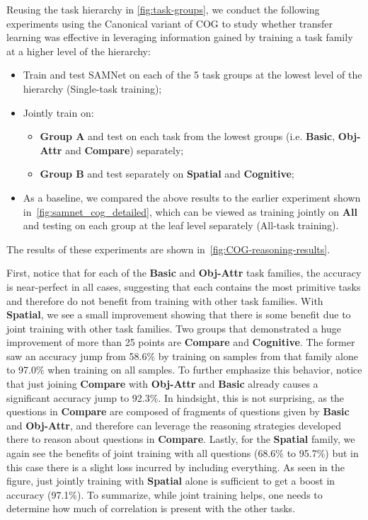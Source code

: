 Reusing the task hierarchy in \cref{fig:task-groups}, we conduct the following experiments using the Canonical variant of COG to study whether transfer learning was effective in leveraging information gained by training a task family at a higher level
of the hierarchy:
 \begin{itemize}
 	\compresslist
	\item Train and test SAMNet on each of the 5 task groups at the lowest level of the hierarchy (Single-task training);
	\item Jointly train on:
	\begin{itemize}
		\item \textbf{Group A} and test on each task from the lowest groups (i.e. \textbf{Basic}, \textbf{Obj-Attr} and \textbf{Compare}) separately;
		\item \textbf{Group B} and test separately on \textbf{Spatial} and \textbf{Cognitive};
	\end{itemize}
	\item As a baseline, we compared the above results to the earlier experiment shown in~\cref{fig:samnet_cog_detailed}, which can be viewed as training jointly on \textbf{All} and testing on each group at the leaf level separately (All-task training).
\end{itemize}

The results of these experiments are shown in~\cref{fig:COG-reasoning-results}.

First, notice that for each of the \textbf{Basic} and \textbf{Obj-Attr} task families, the accuracy is near-perfect in all cases, suggesting that each contains the most primitive tasks and therefore do not benefit from training with other task families.
With \textbf{Spatial}, we see a small improvement showing that there is some benefit due to joint training with other task families.
Two groups that demonstrated a huge improvement of more than 25 points are \textbf{Compare} and \textbf{Cognitive}.
The former saw an accuracy jump from 58.6\% by training on samples from that family alone
to 97.0\% when training on all samples. To further emphasize this behavior, notice that
just joining \textbf{Compare} with \textbf{Obj-Attr} and \textbf{Basic} already causes a significant accuracy jump to 92.3\%.
In hindsight, this is not surprising, as the questions in \textbf{Compare} are composed
of fragments of questions given by \textbf{Basic} and \textbf{Obj-Attr}, and therefore can leverage the reasoning strategies developed there to reason about questions in \textbf{Compare}.
Lastly, for the \textbf{Spatial} family, we again see the benefits of joint training with all questions (68.6\% to 95.7\%) but in this case there
is a slight loss incurred by including everything. As seen in the figure, just jointly training with \textbf{Spatial} alone is sufficient to get a boost in accuracy (97.1\%). To summarize, while joint training helps, one needs to determine how much of correlation is present with the other tasks.
